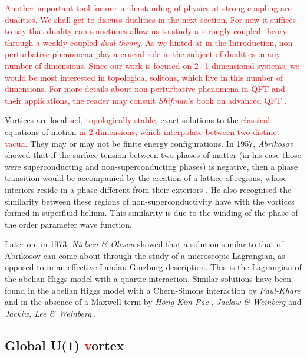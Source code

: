         \textcolor{red}{Another important tool for our understanding of physics at strong coupling are dualities. We shall get to discuss dualities in the next section. For now it suffices to say that duality can sometimes allow us to study a strongly coupled theory through a weakly coupled \textit{dual theory}. As we hinted at in the Introduction, non-perturbative phenomena play a crucial role in the subject of dualities in any number of dimensions. Since our work is focused on 2+1 dimensional systems, we would be most interested in topological solitons, which live in this number of dimensions. For more details about non-perturbative phenomena in QFT and their applications, the reader may consult \textit{Shifman}'s book on advanced QFT \cite{shifman2012}. }
        
        Vortices are locali\textcolor{red}{s}ed, \textcolor{red}{ topologically stable,} exact solutions to the \textcolor{red}{classical} equations of motion \textcolor{red}{ in 2 dimensions, which interpolate between two distinct vacua.}  They may or may not be finite energy configurations.
        In 1957, \textit{Abrikosov}  showed that if the surface tension between two phases of matter (in his case those were superconducting and non-superconducting phases) is negative, then a phase transition would be accompanied by the creation of a lattice of regions, whose interiors reside in a phase different from their exteriors \cite{Abrikosov1957}. He also recogni\textcolor{red}{s}ed the similarity between these regions of non-superconductivity have with the vortices formed in superfluid helium. This similarity is due to the winding of the phase of the order parameter wave function.


        Later on, in 1973, \textit{Nielsen \& Olesen} \cite{Nielsen:1973cs} showed that a solution similar to that of Abrikosov can come about through the study of a microscopic Lagrangian, as opposed to in an effective Landau-Ginzburg description. This is the Lagrangian of the abelian Higgs model with a quartic interaction. Similar solutions have been found in the abelian Higgs model with a Chern-Simons interaction by \textit{Paul-Khare} \cite{Paul:1986ix} and in the absence of a Maxwell term by \textit{Hong-Kim-Pac} \cite{Hong:1990yh}, \textit{Jackiw \& Weinberg} \cite{Jackiw:1990aw} and \textit{Jackiw, Lee \& Weinberg} \cite{Jackiw:1990pr}.

        \subsection{Global U(1) \textcolor{red}{v}ortex}

